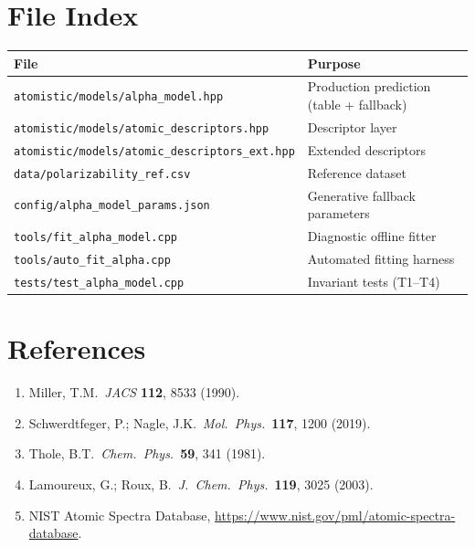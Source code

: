 \documentclass[11pt,a4paper]{article}
\begin{document}
\section{File Index}

\begin{center}
\begin{tabular}{ll}
\toprule
\textbf{File} & \textbf{Purpose} \\
\midrule
\texttt{atomistic/models/alpha\_model.hpp} & Production prediction (table + fallback) \\
\texttt{atomistic/models/atomic\_descriptors.hpp} & Descriptor layer \\
\texttt{atomistic/models/atomic\_descriptors\_ext.hpp} & Extended descriptors \\
\texttt{data/polarizability\_ref.csv} & Reference dataset \\
\texttt{config/alpha\_model\_params.json} & Generative fallback parameters \\
\texttt{tools/fit\_alpha\_model.cpp} & Diagnostic offline fitter \\
\texttt{tools/auto\_fit\_alpha.cpp} & Automated fitting harness \\
\texttt{tests/test\_alpha\_model.cpp} & Invariant tests (T1--T4) \\
\bottomrule
\end{tabular}
\end{center}

\section*{References}

\begin{enumerate}
  \item Miller, T.M.\ \textit{JACS} \textbf{112}, 8533 (1990).
  \item Schwerdtfeger, P.; Nagle, J.K.\ \textit{Mol.\ Phys.}\ \textbf{117}, 1200 (2019).
  \item Thole, B.T.\ \textit{Chem.\ Phys.}\ \textbf{59}, 341 (1981).
  \item Lamoureux, G.; Roux, B.\ \textit{J.\ Chem.\ Phys.}\ \textbf{119}, 3025 (2003).
  \item NIST Atomic Spectra Database, \url{https://www.nist.gov/pml/atomic-spectra-database}.
\end{enumerate}
\end{document}
